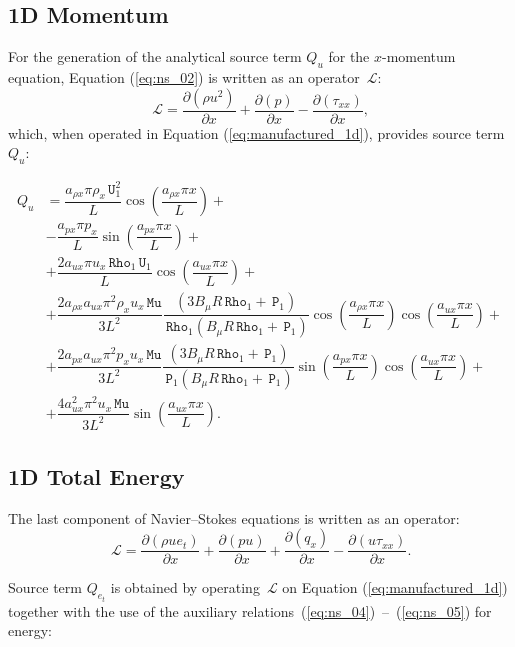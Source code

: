 \documentclass[10pt]{article}
\newcommand{\Diff}[2] {\dfrac{\partial( #1)}{\partial #2}}
\newcommand{\Rho}{\,\mathtt{Rho}}
\newcommand{\PP}{\,\mathtt{P}}
\newcommand{\U}{\,\mathtt{U}}
\newcommand{\Lo}{\,\mathcal{L}}
\newcommand{\MU}{\,\mathtt{Mu}}
\begin{document}
\subsection{1D Momentum}

For the generation of the analytical source term $Q_u$ for the $x$-momentum equation, Equation  (\ref{eq:ns_02}) is written as an  operator $\Lo$:
\begin{equation*}
 \Lo=\Diff{\rho u^2 }{x}+ \Diff{p}{x} -\Diff{\tau_{xx}}{x},
\end{equation*}
which, when operated in Equation (\ref{eq:manufactured_1d}), provides source term $Q_{u}$:

\begin{equation}
 \begin{split}
Q_u&=\dfrac{a_{\rho x} \pi \rho_x \U_1^2}{L}\cos\left(\dfrac{a_{\rho x} \pi x}{L}\right) +\\
&-\dfrac{ a_{px} \pi p_x}{L}\sin\left(\dfrac{a_{px} \pi x}{L}\right) +\\
&+  \dfrac{2a_{ux} \pi u_x \Rho_1 \U_1}{L}\cos\left(\dfrac{a_{ux} \pi x}{L}\right)+\\
&+ \dfrac{2 a_{\rho x} a_{ux} \pi^2 \rho_x u_x \MU}{3L^2}\dfrac{ (3 B_\mu R \Rho_1 +\PP_1) }{\Rho_1  (B_\mu R \Rho_1 +\PP_1)  }\cos\left(\dfrac{a_{\rho x} \pi x}{L}\right) \cos\left(\dfrac{a_{ux} \pi x}{L}\right)  +\\
&+\dfrac{2 a_{px} a_{ux} \pi^2 p_x u_x \MU}{3L^2}\dfrac{(3 B_\mu R \Rho_1 +\PP_1) }{\PP_1 (B_\mu R \Rho_1 +\PP_1)  } \sin\left(\dfrac{a_{px} \pi x}{L}\right) \cos\left(\dfrac{a_{ux} \pi x}{L}\right)  +\\
&+\dfrac{4 a_{ux}^2 \pi^2 u_x \MU }{3L^2}\sin\left(\dfrac{a_{ux} \pi x}{L}\right).
 \end{split}
\end{equation}



\subsection{1D Total Energy}


The last component of Navier--Stokes equations is written as an operator:
\begin{equation*}
 \Lo=\Diff{\rho ue_t}{x}+ \Diff{pu}{x}+ \Diff{q_x}{x}-\Diff{u\tau_{xx}}{x} .
\end{equation*}


Source term $Q_{e_t}$ is obtained by operating $\Lo$ on Equation  (\ref{eq:manufactured_1d}) together with the use of the  auxiliary relations~(\ref{eq:ns_04})~--~(\ref{eq:ns_05}) for energy:
\end{document}
